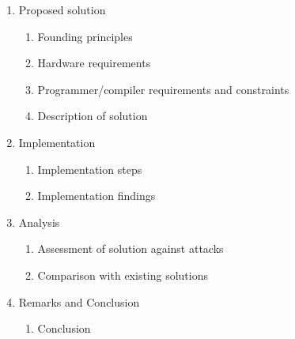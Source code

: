 \documentclass[10pt]{report}
\begin{document}
\begin{enumerate}
\begin{enumerate}[{5.}1]
		\end{enumerate}
	\item Proposed solution
		\begin{enumerate}[{6.}1]
			\item Founding principles
			\item Hardware requirements
			\item Programmer/compiler requirements and constraints
			\item Description of solution
		\end{enumerate}
	\item Implementation
		\begin{enumerate}[{7.}1]
			\item Implementation steps
			\item Implementation findings			
		\end{enumerate}
	\item Analysis
		\begin{enumerate}[{8.}1]
			\item Assessment of solution against attacks
			\item Comparison with existing solutions
		\end{enumerate}
	\item Remarks and Conclusion
		\begin{enumerate}[{9.}1]
			\item Conclusion
		\end{enumerate}
\end{enumerate}

\end{document}
